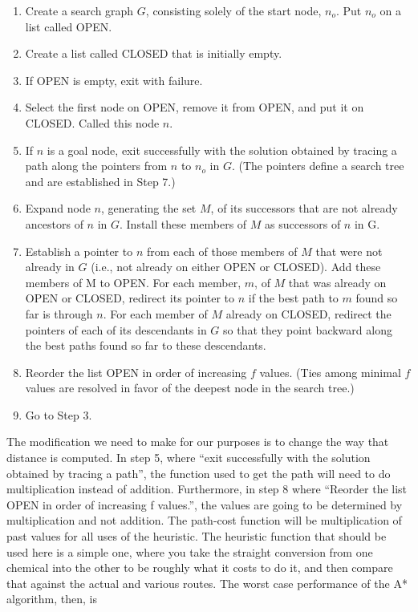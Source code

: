 \documentclass[11pt]{article}
\begin{document}
\begin{enumerate}[label=\textbf{\Alph*.}]
\begin{enumerate}[label={\arabic*.}]
\item Create a search graph $G$, consisting solely of the start node, $n_o$. Put $n_o$ on a list called OPEN.
\item Create a list called CLOSED that is initially empty.
\item If OPEN is empty, exit with failure.
\item Select the first node on OPEN, remove it from OPEN, and put it on CLOSED. Called this node $n$.
\item If $n$ is a goal node, exit successfully with the solution obtained by tracing a path along the pointers from $n$ to $n_o$ in $G$. (The pointers define a search tree and are established in Step 7.)
\item Expand node $n$, generating the set $M$, of its successors that are not already ancestors of $n$ in $G$. Install these members of $M$ as successors of $n$ in G.
\item Establish a pointer to $n$ from each of those members of $M$ that were not already in $G$ (i.e., not already on either OPEN or CLOSED). Add these members of M to OPEN. For each member, $m$, of $M$ that was already on OPEN or CLOSED, redirect its pointer to $n$ if the best path to $m$ found so far is through $n$. For each member of $M$ already on CLOSED, redirect the pointers of each of its descendants in $G$ so that they point backward along the best paths found so far to these descendants.
\item Reorder the list OPEN in order of increasing $f$ values. (Ties among minimal $f$ values are resolved in favor of the deepest node in the search tree.)
\item Go to Step 3.
\end{enumerate}

The modification we need to make for our purposes is to change the
way that distance is computed. In step 5, where ``exit successfully with the solution obtained by tracing a path'', the function used to get the path
will need to do multiplication instead of addition. Furthermore, in step
8 where ``Reorder the list OPEN in order of increasing f values.'', the
values are going to be determined by multiplication and not addition.
The path-cost function will be multiplication of past values for all
uses of the heuristic. The heuristic function that should be used here
is a simple one, where you take the straight conversion from one chemical
into the other to be roughly what it costs to do it, and then compare that
against the actual and various routes. The worst case performance of the
A* algorithm, then, is


\end{enumerate}
\end{document}
